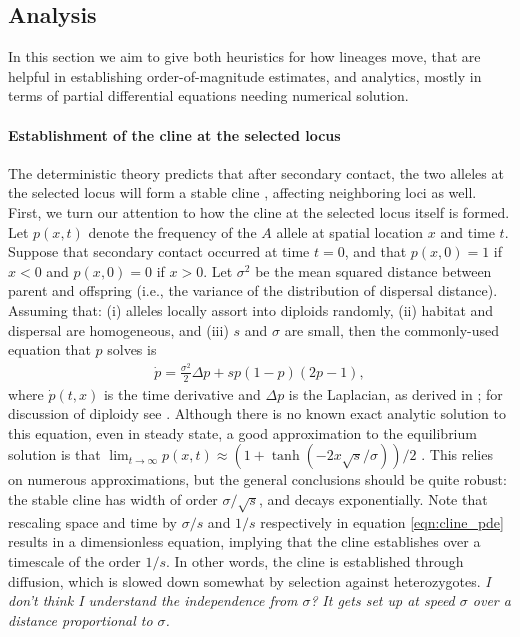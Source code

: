 \documentclass[11pt,letterpaper]{article}
\newcommand{\alisa}[1]{{\em \color{red} #1}}
\newcommand{\plr}[1]{{\em \color{blue} #1}}
\begin{document}


\subsection*{Analysis}

In this section we aim to give both heuristics for how lineages move, 
that are helpful in establishing order-of-magnitude estimates,
and analytics, mostly in terms of partial differential equations needing numerical solution.

\paragraph{Establishment of the cline at the selected locus}
The deterministic theory predicts that after secondary contact,
the two alleles at the selected locus will form a stable cline \citep{Barton1979},
affecting neighboring loci as well.
First, we turn our attention to how the cline at the selected locus itself is formed.
Let $p(x,t)$ denote the frequency of the $A$ allele at spatial location $x$ and time $t$.  
Suppose that secondary contact occurred at time $t=0$, 
and that $p(x,0) = 1$ if $x<0$ and $p(x,0)=0$ if $x>0$.
Let $\sigma^2$ be the mean squared distance between parent and offspring 
(i.e., the variance of the distribution of dispersal distance).
Assuming that: (i) alleles locally assort into diploids randomly, 
(ii) habitat and dispersal are homogeneous, and 
(iii) $s$ and $\sigma$ are small, then the commonly-used equation that $p$ solves is
\begin{align} \label{eqn:cline_pde}
    \dot p = \frac{\sigma^2}{2} \Delta p + s p (1-p) (2p-1) ,
\end{align}
where $\dot p(t,x)$ is the time derivative and $\Delta p$ is the Laplacian,
as derived in \citet{Bazykin1969}; for discussion of diploidy see \citep{christiansen1995genotypic}.
Although there is no known exact analytic solution to this equation, even in steady state, 
a good approximation to the equilibrium solution is that
$\lim_{t \to \infty} p(x,t) \approx (1+\tanh(-2x\sqrt{s}/\sigma))/2$ \citep{Bazykin1969}. 
This relies on numerous approximations, but the general conclusions should be quite robust: 
the stable cline has width of order $\sigma/\sqrt{s}$, and decays exponentially. 
Note that rescaling space and time by $\sigma/s$ and $1/s$ respectively in equation \eqref{eqn:cline_pde} results in a dimensionless equation,
implying that the cline establishes over a timescale of the order $1/s$. 
In other words, the cline is established through diffusion, which is slowed down somewhat by selection against heterozygotes. 
\alisa{I don't think I understand the independence from $\sigma$?}
\plr{It gets set up at speed $\sigma$ over a distance proportional to $\sigma$.}
\end{document}
